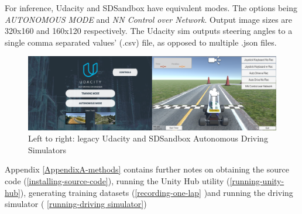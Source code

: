 For inference, Udacity and SDSandbox have equivalent modes. The options being   
\textit{AUTONOMOUS MODE} and \textit{NN Control over Network}. Output image sizes are 320x160 and 160x120 respectively. The Udacity sim outputs steering angles to a single comma separated values' (.csv) file, as opposed to multiple .json files. 

\begin{figure}[h!]
\centering
\includegraphics[width=\textwidth]{Figures/UdacitySdSandboxSim.png}
\caption{Left to right: legacy Udacity and SDSandbox Autonomous Driving Simulators}
\label{fig:UdacitySdSandboxAutonomous}
\end{figure}

Appendix \ref{AppendixA-methods} contains further notes on obtaining the source code (\ref{installing-source-code}), running the Unity Hub utility (\ref{running-unity-hub}), generating training datasets (\ref{recording-one-lap} )and running the driving simulator (
\ref{running-driving simulator})





